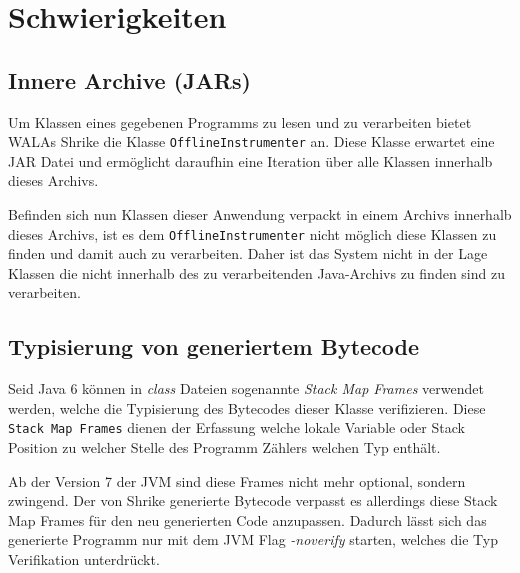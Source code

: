 \section{Schwierigkeiten}

\subsection{Innere Archive (JARs)}

Um Klassen eines gegebenen Programms zu lesen und zu verarbeiten bietet WALAs Shrike die Klasse
\texttt{OfflineInstrumenter} an. Diese Klasse erwartet eine JAR Datei und ermöglicht daraufhin
eine Iteration über alle Klassen innerhalb dieses Archivs. 

Befinden sich nun Klassen dieser Anwendung verpackt in einem Archivs innerhalb dieses Archivs,
ist es dem \texttt{OfflineInstrumenter} nicht möglich diese Klassen zu finden und damit auch zu verarbeiten. 
Daher ist das System nicht in der Lage Klassen die nicht innerhalb des zu verarbeitenden Java-Archivs zu finden 
sind zu verarbeiten.

\subsection{Typisierung von generiertem Bytecode} 

Seid Java 6 können in \textit{class} Dateien sogenannte \textit{Stack Map Frames}
verwendet werden, welche die Typisierung des Bytecodes dieser Klasse verifizieren.
Diese \texttt{Stack Map Frames} dienen der Erfassung welche lokale Variable oder 
Stack Position zu welcher Stelle des Programm Zählers welchen Typ enthält.

Ab der Version 7 der JVM sind diese Frames nicht mehr optional, sondern zwingend. 
Der von Shrike generierte Bytecode verpasst es allerdings diese Stack Map Frames
für den neu generierten Code anzupassen. Dadurch lässt sich das generierte Programm 
nur mit dem JVM Flag \textit{-noverify} starten, welches die Typ Verifikation 
unterdrückt.
